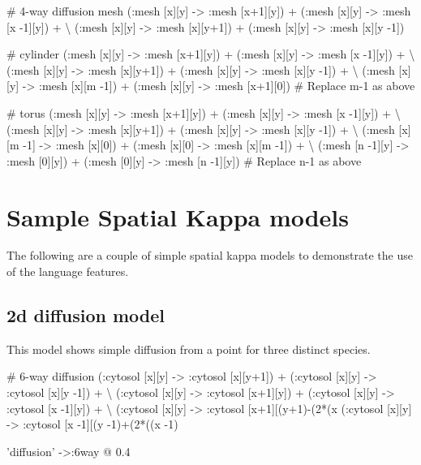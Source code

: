 \begin{kappasource}

# 4-way diffusion mesh
    (:mesh [x][y] -> :mesh [x+1][y]) + (:mesh [x][y] -> :mesh [x -1][y]) + {\textbackslash}
    (:mesh [x][y] -> :mesh [x][y+1]) + (:mesh [x][y] -> :mesh [x][y -1])

# cylinder
    (:mesh [x][y] -> :mesh [x+1][y]) + (:mesh [x][y] -> :mesh [x -1][y]) + {\textbackslash}
    (:mesh [x][y] -> :mesh [x][y+1]) + (:mesh [x][y] -> :mesh [x][y -1]) + {\textbackslash}
    (:mesh [x][y] -> :mesh [x][m -1]) + (:mesh [x][y] -> :mesh [x+1][0]) 
# Replace m-1 as above 

# torus
    (:mesh [x][y] -> :mesh [x+1][y]) + (:mesh [x][y] -> :mesh [x -1][y]) + {\textbackslash}
    (:mesh [x][y] -> :mesh [x][y+1]) + (:mesh [x][y] -> :mesh [x][y -1]) + {\textbackslash}
    (:mesh [x][m -1] -> :mesh [x][0]) + (:mesh [x][0] -> :mesh [x][m -1]) + {\textbackslash}
    (:mesh [n -1][y] -> :mesh [0][y]) + (:mesh [0][y] -> :mesh [n -1][y])
# Replace n-1 as above 
\end{kappasource}

\newpage
\section{Sample Spatial Kappa models}

The following are a couple of simple spatial kappa models to demonstrate the use of the language features.



\subsection{2d diffusion model}
\label{sec:2dDiffusion}

This model shows simple diffusion from a point for three distinct species.


\begin{kappasource}


# 6-way diffusion
    (:cytosol [x][y] -> :cytosol [x][y+1]) + (:cytosol [x][y] -> :cytosol [x][y -1]) + {\textbackslash}
    (:cytosol [x][y] -> :cytosol [x+1][y]) + (:cytosol [x][y] -> :cytosol [x -1][y]) + {\textbackslash}
    (:cytosol [x][y] -> :cytosol [x+1][(y+1)-(2*(x%
    (:cytosol [x][y] -> :cytosol [x -1][(y -1)+(2*((x -1)%

'diffusion' ->:6way @ 0.4


\end{kappasource}


